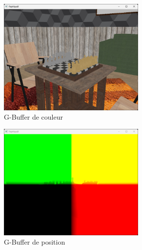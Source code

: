     \begin{figure}[H]
        \begin{subfigure}{0.5\textwidth}
            \centering
            \includegraphics[width=0.8\textwidth]{images/raptiquax_rendering_gbuffer_albedo.png}
            \caption{G-Buffer de couleur}
            \label{fig:graphics_pipeline_gbuffer_albedo}
        \end{subfigure}
        \begin{subfigure}{0.5\textwidth}
            \centering
            \includegraphics[width=0.8\textwidth]{images/raptiquax_rendering_gbuffer_position.png}
            \caption{G-Buffer de position}
            \label{fig:graphics_pipeline_gbuffer_position}
        \end{subfigure}
        \begin{subfigure}{0.5\textwidth}
            \centering

\end{subfigure}
\end{figure}
